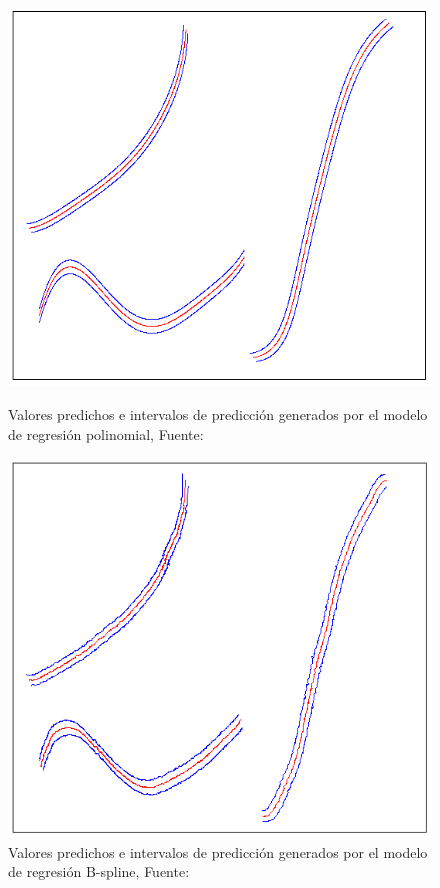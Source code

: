 \begin{anexos}
\begin{figure}[H]
	\centering
	\begin{minipage}{0.48\linewidth}  %
		\centering
		\includegraphics[width=0.9\linewidth]{polinomial.png} %
		\caption{Valores predichos e intervalos de predicción generados por el modelo de regresión polinomial, Fuente: \cite{lin2009free}}
		\label{free-form-draw-polinomial}
	\end{minipage}%
	\hfill
	\begin{minipage}{0.48\linewidth} %
		\centering
		\includegraphics[width=0.9\linewidth]{b-spline.png} %
		\caption{Valores predichos e intervalos de predicción generados por el modelo de regresión B-spline, Fuente: \cite{lin2009free}}
		\label{free-form-draw-spline}
	\end{minipage}
	

\end{figure}
\end{anexos}
